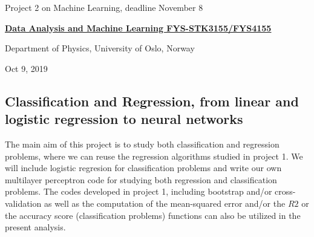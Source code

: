 \documentclass[%
oneside,                 %
final,                   %
10pt]{article}
\begin{document}

\newcommand{\exercisesection}[1]{\subsection*{#1}}






\thispagestyle{empty}

\begin{center}
{\LARGE\bf
\begin{spacing}{1.25}
Project 2 on Machine Learning, deadline November 8
\end{spacing}
}
\end{center}


\begin{center}
{\bf \href{{http://www.uio.no/studier/emner/matnat/fys/FYS3155/index-eng.html}}{Data Analysis and Machine Learning FYS-STK3155/FYS4155}}
\end{center}

    \begin{center}
\centerline{{\small Department of Physics, University of Oslo, Norway}}
\end{center}
    

\begin{center}
Oct 9, 2019
\end{center}

\vspace{1cm}


\subsection{Classification and Regression, from linear and logistic regression to neural networks}

The main aim of this project is to study both classification and
regression problems, where we can reuse the regression algorithms studied
in project 1. We will include logistic regresion for classification
problems and write our own multilayer perceptron code for studying
both regression and classification problems.  The codes developed in
project 1, including bootstrap and/or cross-validation as well as the
computation of the mean-squared error and/or the $R2$ or the accuracy score (classification problems) functions can
also be utilized in the present analysis. 
\end{document}

